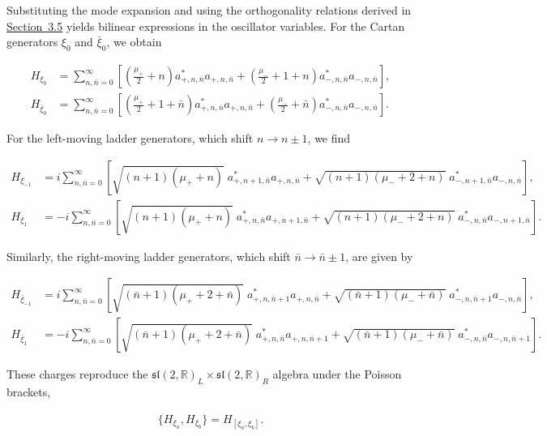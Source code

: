 Substituting the mode expansion and using the orthogonality relations derived in \hyperref[subsec:symplectic-form]{Section~3.5} yields bilinear expressions in the oscillator variables. For the Cartan generators $\xi_0$ and $\bar\xi_0$, we obtain

 \begin{align}
H_{\xi_0} & = \sum_{n,\bar{n}=0}^{\infty} \left[ \left(\frac{\mu_+}{2} + n\right) a^{*}_{+,n,\bar{n}} a_{+,n,\bar{n}} + \left(\frac{\mu_-}{2} + 1 + n\right) a^{*}_{-,n,\bar{n}} a_{-,n,\bar{n}} \right], \\
H_{\bar{\xi}_0} & = \sum_{n,\bar{n}=0}^{\infty} \left[ \left(\frac{\mu_+}{2} + 1 + \bar{n}\right) a^{*}_{+,n,\bar{n}} a_{+,n,\bar{n}} + \left(\frac{\mu_-}{2} + \bar{n}\right) a^{*}_{-,n,\bar{n}} a_{-,n,\bar{n}} \right].
\end{align}

For the left-moving ladder generators, which shift $n \to n\pm1$, we find

 \begin{align}
H_{\xi_{-1}} & = i \sum_{n,\bar{n}=0}^{\infty} \left[ \sqrt{(n+1)(\mu_+ + n)}\; a^{*}_{+,n+1,\bar{n}} a_{+,n,\bar{n}} + \sqrt{(n+1)(\mu_- + 2 + n)}\; a^{*}_{-,n+1,\bar{n}} a_{-,n,\bar{n}} \right], \\
H_{\xi_{1}} & = -i \sum_{n,\bar{n}=0}^{\infty} \left[ \sqrt{(n+1)(\mu_+ + n)}\; a^{*}_{+,n,\bar{n}} a_{+,n+1,\bar{n}} + \sqrt{(n+1)(\mu_- + 2 + n)}\; a^{*}_{-,n,\bar{n}} a_{-,n+1,\bar{n}} \right].
\end{align}

Similarly, the right-moving ladder generators, which shift $\bar n \to \bar n \pm 1$, are given by

 \begin{align}
H_{\bar{\xi}_{-1}} & = i \sum_{n,\bar{n}=0}^{\infty} \left[ \sqrt{(\bar{n}+1)(\mu_+ + 2 + \bar{n})}\; a^{*}_{+,n,\bar{n}+1} a_{+,n,\bar{n}} + \sqrt{(\bar{n}+1)(\mu_- + \bar{n})}\; a^{*}_{-,n,\bar{n}+1} a_{-,n,\bar{n}} \right], \\
H_{\bar{\xi}_{1}} & = -i \sum_{n,\bar{n}=0}^{\infty} \left[ \sqrt{(\bar{n}+1)(\mu_+ + 2 + \bar{n})}\; a^{*}_{+,n,\bar{n}} a_{+,n,\bar{n}+1} + \sqrt{(\bar{n}+1)(\mu_- + \bar{n})}\; a^{*}_{-,n,\bar{n}} a_{-,n,\bar{n}+1} \right].
\end{align}

These charges reproduce the $\mathfrak{sl}(2,\mathbb{R})_L \times \mathfrak{sl}(2,\mathbb{R})_R$ algebra under the Poisson brackets,

\begin{align}
\{H_{\xi_a}, H_{\xi_b}\} = H_{[\xi_a,\xi_b]}.
\end{align}

